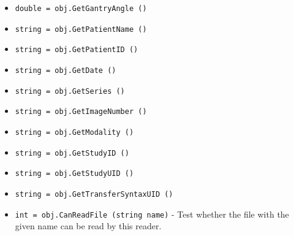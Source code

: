 \begin{itemize}
\item  \verb|double = obj.GetGantryAngle ()|

\item  \verb|string = obj.GetPatientName ()|

\item  \verb|string = obj.GetPatientID ()|

\item  \verb|string = obj.GetDate ()|

\item  \verb|string = obj.GetSeries ()|

\item  \verb|string = obj.GetImageNumber ()|

\item  \verb|string = obj.GetModality ()|

\item  \verb|string = obj.GetStudyID ()|

\item  \verb|string = obj.GetStudyUID ()|

\item  \verb|string = obj.GetTransferSyntaxUID ()|

\item  \verb|int = obj.CanReadFile (string name)| -  Test whether the file with the given name can be read by this
 reader.

\end{itemize}

